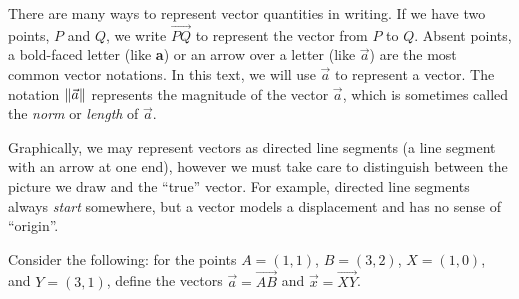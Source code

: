 \begin{center}
\end{center}



There are many ways to represent vector quantities in writing.  If
we have two points, $P$ and $Q$, we write $\overrightarrow{PQ}$ to represent the
vector from $P$ to $Q$.  Absent points, a bold-faced letter (like {\bfseries a})
or an arrow over 
a letter (like $\vec a$) are the most common vector notations.
In this text, we will use $\vec a$ to represent a vector.
The notation $\lVert\vec a\rVert$\index[symbols]{$\norm{\:\cdot\:}$}
represents the magnitude of the vector $\vec a$, which is sometimes called
the \emph{norm} or \emph{length} of $\vec a$.


Graphically, we may represent vectors as directed line segments (a
line segment with an arrow at one end), however we must take care to
distinguish between the picture we draw and the ``true'' vector.
For example, directed line segments always \emph{start} somewhere, but a vector
models a displacement and has no sense of ``origin''.

Consider the following: for the points $A=(1,1)$, $B=(3,2)$, $X=(1,0)$, and $Y=(3,1)$, define the vectors
$\vec a = \overrightarrow{AB}$ and $\vec x=\overrightarrow{XY}$.  


